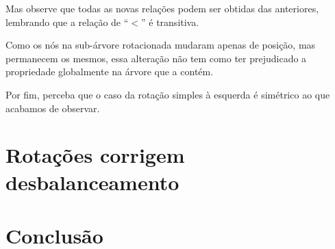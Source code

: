 \documentclass[11pt,twoside]{article}
\theoremstyle{definition}
\begin{document}
Mas observe que todas as novas relações podem ser obtidas das anteriores, lembrando que a relação de ``\( < \)'' é transitiva.

Como os nós na sub-árvore rotacionada mudaram apenas de posição, mas permanecem os mesmos, essa alteração não tem como ter prejudicado a propriedade globalmente na árvore que a contém.

Por fim, perceba que o caso da rotação simples à esquerda é simétrico ao que acabamos de observar.

\section{Rotações corrigem desbalanceamento}

\section{Conclusão}




\end{document}
